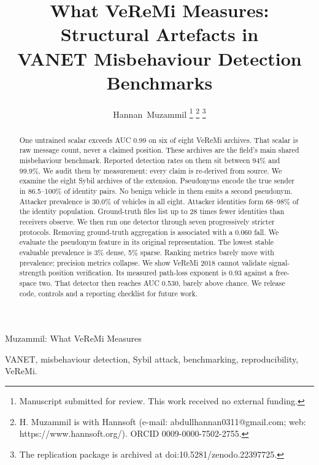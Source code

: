 \documentclass[journal,twoside]{IEEEtran}
\begin{document}
\title{What VeReMi Measures: Structural Artefacts in\\ VANET Misbehaviour Detection Benchmarks}

\author{Hannan~Muzammil%
\thanks{Manuscript submitted for review. This work received no external funding.}%
\thanks{H. Muzammil is with Hannsoft (e-mail: abdullhannan0311@gmail.com;
web: https://www.hannsoft.org/). ORCID 0009-0000-7502-2755.}%
\thanks{The replication package is archived at doi:10.5281/zenodo.22397725.}}

%
{Muzammil: What VeReMi Measures}
\maketitle

\begin{abstract}
One untrained scalar exceeds AUC 0.99 on six of eight VeReMi archives.
That scalar is raw message count, never a claimed position.
These archives are the field's main shared misbehaviour benchmark.
Reported detection rates on them sit between 94\% and 99.9\%.
We audit them by measurement: every claim is re-derived from source.
We examine the eight Sybil archives of the extension.
Pseudonyms encode the true sender in 86.5--100\% of identity pairs.
No benign vehicle in them emits a second pseudonym.
Attacker prevalence is 30.0\% of vehicles in all eight.
Attacker identities form 68--98\% of the identity population.
Ground-truth files list up to 28 times fewer identities than receivers observe.
We then run one detector through seven progressively stricter protocols.
Removing ground-truth aggregation is associated with a 0.060 fall.
We evaluate the pseudonym feature in its original representation.
The lowest stable evaluable prevalence is 3\% dense, 5\% sparse.
Ranking metrics barely move with prevalence; precision metrics collapse.
We show VeReMi 2018 cannot validate signal-strength position verification.
Its measured path-loss exponent is 0.93 against a free-space two.
That detector then reaches AUC 0.530, barely above chance.
We release code, controls and a reporting checklist for future work.
\end{abstract}

\begin{IEEEkeywords}
VANET, misbehaviour detection, Sybil attack, benchmarking, reproducibility, VeReMi.
\end{IEEEkeywords}
\end{document}
